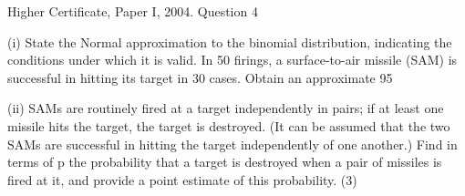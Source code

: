 \documentclass[a4paper,12pt]{article}
\begin{document}
Higher Certificate, Paper I, 2004. Question 4
\begin{framed}
 (i) State the Normal approximation to the binomial distribution, indicating the conditions under which it is valid.  In 50 firings, a surface-to-air missile (SAM) is successful in hitting its target in 30 cases.  Obtain an approximate 95%
 
 
 (ii) SAMs are routinely fired at a target independently in pairs;  if at least one missile hits the target, the target is destroyed.  (It can be assumed that the two SAMs are successful in hitting the target independently of one another.)  Find in terms of p the probability that a target is destroyed when a pair of missiles is fired at it, and provide a point estimate of this probability. (3) 
 
 

 
 
\end{framed}
\end{document}
